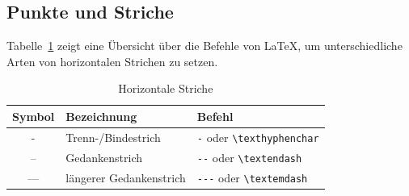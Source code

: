 

\subsection{Punkte und Striche}

Tabelle~\ref{Tabelle_Horizontale_Striche} zeigt eine Übersicht über die Befehle von \LaTeX, um unterschiedliche Arten von horizontalen Strichen zu setzen. 

\begin{table}[h!tb]
	\centering
	\caption{Horizontale Striche}
	\label{Tabelle_Horizontale_Striche}       %
	\begin{tabular}{cll}
		\hline
		Symbol & Bezeichnung & Befehl \\ 
		\hline
		- & Trenn-/Bindestrich & \texttt{-} oder \texttt{\textbackslash texthyphenchar}\\
		-- & Gedankenstrich & \texttt{-{}-} oder \texttt{\textbackslash textendash} \\
		--- & längerer Gedankenstrich & \texttt{-{}-{}-} oder \texttt{\textbackslash textemdash} \\
		\hline
	\end{tabular}
\end{table}

